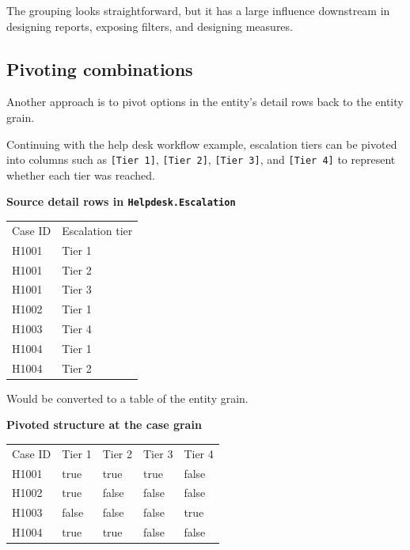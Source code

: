\documentclass[10pt,openany,10pt]{book}
\newcounter{none}
\let\podeToprule\toprule
\let\podeMidrule\midrule
\let\podeBottomrule\bottomrule
\renewcommand{\toprule}{\arrayrulecolor{pbiGrid}\podeToprule}
\renewcommand{\midrule}{\arrayrulecolor{pbiGrid}\podeMidrule}
\renewcommand{\bottomrule}{\arrayrulecolor{pbiGrid}\podeBottomrule}
\begin{document}
The grouping looks straightforward, but it has a large influence
downstream in designing reports, exposing filters, and designing
measures.

\subsection{Pivoting combinations}\label{pivoting-combinations}

Another approach is to pivot options in the entity's detail rows back to
the entity grain.

Continuing with the help desk workflow example, escalation tiers can be
pivoted into columns such as \texttt{{[}Tier\ 1{]}},
\texttt{{[}Tier\ 2{]}}, \texttt{{[}Tier\ 3{]}}, and
\texttt{{[}Tier\ 4{]}} to represent whether each tier was reached.

\textbf{Source detail rows in \texttt{Helpdesk.Escalation}}

{\def\LTcaptype{none} %
\begin{longtable}[]{@{}ll@{}}
\toprule\noalign{}
Case ID & Escalation tier \\
\midrule\noalign{}
\endhead
\bottomrule\noalign{}
\endlastfoot
H1001 & Tier 1 \\
H1001 & Tier 2 \\
H1001 & Tier 3 \\
H1002 & Tier 1 \\
H1003 & Tier 4 \\
H1004 & Tier 1 \\
H1004 & Tier 2 \\
\end{longtable}
}

Would be converted to a table of the entity grain.

\textbf{Pivoted structure at the case grain}

{\def\LTcaptype{none} %
\begin{longtable}[]{@{}lllll@{}}
\toprule\noalign{}
Case ID & Tier 1 & Tier 2 & Tier 3 & Tier 4 \\
\midrule\noalign{}
\endhead
\bottomrule\noalign{}
\endlastfoot
H1001 & true & true & true & false \\
H1002 & true & false & false & false \\
H1003 & false & false & false & true \\
H1004 & true & true & false & false \\
\end{longtable}
}
\end{document}
